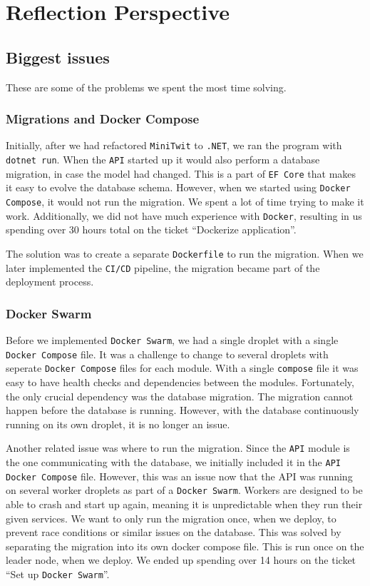 \section{Reflection Perspective}

\subsection{Biggest issues}

These are some of the problems we spent the most time solving.

\subsubsection{Migrations and Docker Compose}

Initially, after we had refactored \texttt{MiniTwit} to \texttt{.NET},
we ran the program with \texttt{dotnet run}. 
When the \texttt{API} started up it would also perform a database migration,
in case the model had changed. This is a part of \texttt{EF Core}
that makes it easy to evolve the database schema.
However, when we started using \texttt{Docker Compose}, 
it would not run the migration.
We spent a lot of time trying to make it work.
Additionally, we did not have much experience with \texttt{Docker},
resulting in us spending over 30 hours total on the ticket
``Dockerize application''.

The solution was to create a separate \texttt{Dockerfile} 
to run the migration.
When we later implemented the \texttt{CI/CD} pipeline, 
the migration became part of the deployment process.

\subsubsection{Docker Swarm}

Before we implemented \texttt{Docker Swarm}, we had a single droplet 
with a single \texttt{Docker Compose} file.
It was a challenge to change to several droplets with 
seperate \texttt{Docker Compose} files for each module.
With a single \texttt{compose} file it was easy to have health checks and
dependencies between the modules. 
Fortunately, the only crucial dependency was the database migration.
The migration cannot happen before the database is running.
However, with the database continuously running on its own droplet,
it is no longer an issue.

Another related issue was where to run the migration.
Since the \texttt{API} module is the one communicating with the database,
we initially included it in the \texttt{API Docker Compose} file.
However, this was an issue now that the API was running on several 
worker droplets as part of a \texttt{Docker Swarm}. Workers are designed
to be able to crash and start up again, 
meaning it is unpredictable when they run their given services.
We want to only run the migration once, when we deploy, to
prevent race conditions or similar issues on the database.
This was solved by separating the migration into its own docker compose file.
This is run once on the leader node, when we deploy.
We ended up spending over 14 hours on the ticket ``Set up \texttt{Docker Swarm}''.

